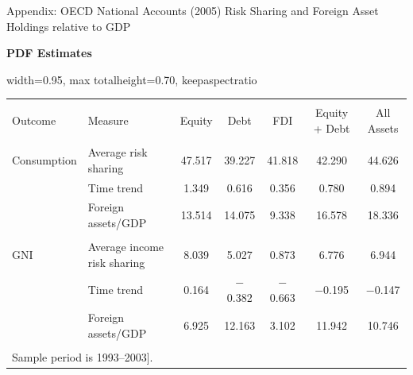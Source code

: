 \documentclass[aspectratio=169, 10pt]{beamer}
\begin{document}
\begin{frame}[label=appendix:oecd2005_assets]{Appendix: OECD National Accounts (2005) Risk Sharing and Foreign Asset Holdings relative to GDP}
\centering

\begingroup
\scriptsize
\setlength{\tabcolsep}{3pt}
\renewcommand{\arraystretch}{0.85}

\vspace{0.10cm}

{\large \textbf{PDF Estimates}}

\vspace{0.15cm}

\begin{adjustbox}{
  width=0.95\textwidth,
  max totalheight=0.70\textheight,
  keepaspectratio
}
\begin{tabular}{@{\extracolsep{5pt}}llccccc}
\\[-1.8ex]\hline
\hline \\[-1.8ex]
Outcome 
& Measure
& Equity 
& Debt 
& FDI 
& Equity + Debt 
& All Assets \\
\hline \\[-1.8ex]

Consumption 
& Average risk sharing 
& 47.517 
& 39.227 
& 41.818 
& 42.290 
& 44.626 \\

& Time trend 
& 1.349 
& 0.616 
& 0.356 
& 0.780 
& 0.894 \\

& Foreign assets/GDP 
& 13.514 
& 14.075 
& 9.338 
& 16.578 
& 18.336 \\

\hline \\[-1.8ex]

GNI 
& Average income risk sharing 
& 8.039 
& 5.027 
& 0.873 
& 6.776 
& 6.944 \\

& Time trend 
& 0.164 
& $-$0.382 
& $-$0.663 
& $-$0.195 
& $-$0.147 \\

& Foreign assets/GDP 
& 6.925 
& 12.163 
& 3.102 
& 11.942 
& 10.746 \\

\hline \\[-1.8ex]
\multicolumn{7}{l}{Sample period is 1993--2003].} \\
\end{tabular}
\end{adjustbox}

\endgroup

\end{frame}


\end{document}
